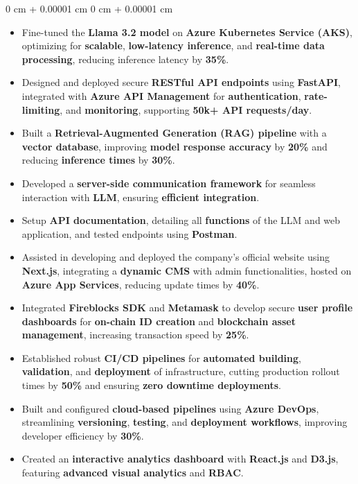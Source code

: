 \documentclass[10pt, letterpaper]{article}
\newenvironment{highlights}{
    \begin{itemize}[
        topsep=0.10 cm,
        parsep=0.10 cm,
        partopsep=0pt,
        itemsep=0pt,
        leftmargin=0 cm + 10pt
    ]
}{
    \end{itemize}
} %
\newenvironment{onecolentry}{
    \begin{adjustwidth}{
        0 cm + 0.00001 cm
    }{
        0 cm + 0.00001 cm
    }
}{
    \end{adjustwidth}
} %
\begin{document}
\begin{onecolentry}
	\begin{highlights}
		\item Fine-tuned the \textbf{Llama 3.2 model} on \textbf{Azure Kubernetes Service (AKS)}, optimizing for \textbf{scalable}, \textbf{low-latency inference}, and \textbf{real-time data processing}, reducing inference latency by \textbf{35\%}.
		\item Designed and deployed secure \textbf{RESTful API endpoints} using \textbf{FastAPI}, integrated with \textbf{Azure API Management} for \textbf{authentication}, \textbf{rate-limiting}, and \textbf{monitoring}, supporting \textbf{50k+ API requests/day}.
		\item Built a \textbf{Retrieval-Augmented Generation (RAG) pipeline} with a \textbf{vector database}, improving \textbf{model response accuracy} by \textbf{20\%} and reducing \textbf{inference times} by \textbf{30\%}.
		\item Developed a \textbf{server-side communication framework} for seamless interaction with \textbf{LLM}, ensuring \textbf{efficient integration}.
		\item Setup \textbf{API documentation}, detailing all \textbf{functions} of the LLM and web application, and tested endpoints using \textbf{Postman}.
		\item Assisted in developing and deployed the company’s official website using \textbf{Next.js}, integrating a \textbf{dynamic CMS} with admin functionalities, hosted on \textbf{Azure App Services}, reducing update times by \textbf{40\%}.
		\item Integrated \textbf{Fireblocks SDK} and \textbf{Metamask} to develop secure \textbf{user profile dashboards} for \textbf{on-chain ID creation} and \textbf{blockchain asset management}, increasing transaction speed by \textbf{25\%}.
		\item Established robust \textbf{CI/CD pipelines} for \textbf{automated building}, \textbf{validation}, and \textbf{deployment} of infrastructure, cutting production rollout times by \textbf{50\%} and ensuring \textbf{zero downtime deployments}.
		\item Built and configured \textbf{cloud-based pipelines} using \textbf{Azure DevOps}, streamlining \textbf{versioning}, \textbf{testing}, and \textbf{deployment workflows}, improving developer efficiency by \textbf{30\%}.
		\item Created an \textbf{interactive analytics dashboard} with \textbf{React.js} and \textbf{D3.js}, featuring \textbf{advanced visual analytics} and \textbf{RBAC}.

\end{highlights}
\end{onecolentry}
\end{document}
